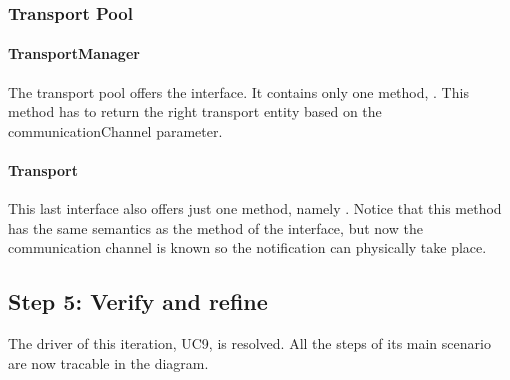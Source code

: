 \subsubsection{Transport Pool}

\paragraph{TransportManager}

\npar The transport pool offers the  interface. It
contains only one method, . This method has to return the right transport entity based on the
communicationChannel parameter.

\paragraph{Transport}

\npar This last interface also offers just one method, namely
. Notice that this method has the same semantics as
the method of the  interface, but now the communication
channel is known so the notification can physically take place.

\subsection{Step 5: Verify and refine}
\label{add:it7/verification}

\npar The driver of this iteration, UC9, is resolved. All the steps of its main
scenario are now tracable in the diagram.
